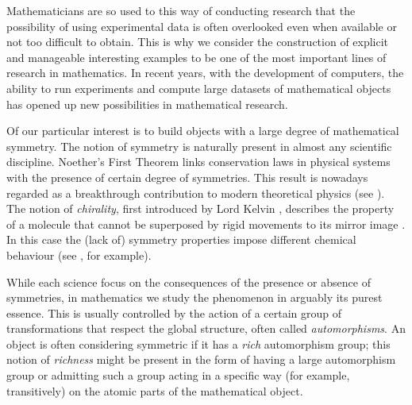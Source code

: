 \documentclass[a4paper,12pt,english]{article}
\begin{document}
Mathematicians are so used to this way of conducting research that the possibility of using experimental data is often overlooked even when available or not too difficult to obtain.
This is why we consider the construction of explicit and manageable interesting examples to be one of the most important lines of research in mathematics.
In recent years, with the development of computers, the ability to run experiments and compute large datasets of mathematical objects has opened up new possibilities in mathematical research.

Of our particular interest is to build objects with a large degree of mathematical symmetry.
The notion of symmetry is naturally present in almost any scientific discipline. 
Noether's First Theorem \cite{Noether1918_InvarianteVariationsprobleme} links conservation laws in physical systems with the presence of certain degree of symmetries. 
This result is nowadays regarded as a breakthrough contribution to modern theoretical physics (see \cite{KosmaSchwa2011_NoetherTheoremsInvariance}).
The notion of \emph{chirality}, first introduced by Lord Kelvin \cite{Kelvin1894_MolecularTacticsCrystal}, describes the property of a molecule that cannot be superposed by rigid movements to its mirror image \cite{McNauWilki1997_CompendiumChemicalTerminology}. 
In this case the (lack of) symmetry properties impose different chemical behaviour (see \cite{JaffAltMer1964_AntipyridoxineEffectPenicillamine}, for example).

While each science focus on the consequences of the presence or absence of symmetries, in mathematics we study the phenomenon in arguably its purest essence. 
This is usually controlled by the action of a certain group of transformations that respect the global structure, often called \emph{automorphisms}. 
An object is often considering symmetric if it has a \emph{rich} automorphism group; this notion of \emph{richness} might be present in the form of having a large automorphism group or admitting such a group acting in a specific way (for example, transitively) on the atomic parts of the mathematical object. 
\end{document}
